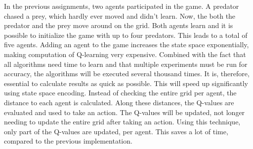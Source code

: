 In the previous assignments, two agents participated in the game. A predator chased a prey, which hardly ever moved and didn't learn. Now, the both the predator and the prey move around on the grid. Both agents learn and it is possible to initialize the game with up to four predators. This leads to a total of five agents. Adding an agent to the game increases the state space exponentially, making computation of Q-learning very expensive. Combined with the fact that all algorithms need time to learn and that multiple experiments must be run for accuracy, the algorithms will be executed several thousand times. It is, therefore, essential to calculate results as quick as possible. This will speed up significantly using state space encoding. Instead of checking the entire grid per agent, the distance to each agent is calculated. Along these distances, the Q-values are evaluated and used to take an action. The Q-values will be updated, not longer needing to update the entire grid after taking an action. Using this technique, only part of the Q-values are updated, per agent. This saves a lot of time, compared to the previous implementation.